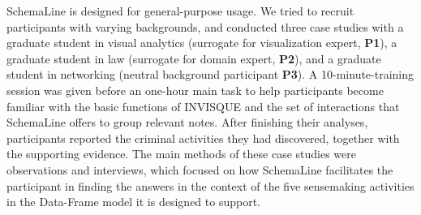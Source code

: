 SchemaLine is designed for general-purpose usage. We tried to recruit participants with varying backgrounds, and conducted three case studies with a graduate student in visual analytics (surrogate for visualization expert, \textbf{P1}), a graduate student in law (surrogate for domain expert, \textbf{P2}), and a graduate student in networking (neutral background participant \textbf{P3}). A 10-minute-training session was given before an one-hour main task to help participants become familiar with the basic functions of INVISQUE and the set of interactions that SchemaLine offers to group relevant notes. After finishing their analyses, participants reported the criminal activities they had discovered, together with the supporting evidence. The main methods of these case studies were observations and interviews, which focused on how SchemaLine facilitates the participant in finding the answers in the context of the five sensemaking activities in the Data-Frame model it is designed to support.



